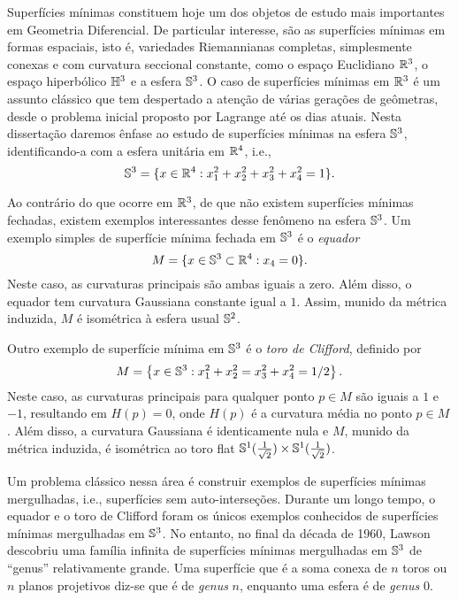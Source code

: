 Superf\'icies m\'inimas constituem hoje um dos objetos de estudo
mais importantes em Geometria Diferencial. De particular interesse, 
s\~ao as superf\'icies m\'inimas em formas espaciais, isto é, variedades Riemannianas completas, simplesmente conexas e com curvatura seccional constante, 
como o espa\c co Euclidiano $\mathbb{R}^3$, o espa\c co hiperb\'olico $\mathbb{H}^3$
e a esfera $\mathbb{S}^3$. O caso de superf\'icies m\'inimas em $\mathbb{R}^3$ \'e um
assunto cl\'assico que tem despertado a aten\c c\~ao de v\'arias 
gera\c c\~oes de ge\^ometras, desde o problema inicial proposto por 
Lagrange at\'e os dias atuais. Nesta disserta\c c\~ao daremos
\^enfase ao estudo de superf\'icies m\'inimas na esfera $\mathbb{S}^3$, 
identificando-a com a esfera unit\'aria em $\mathbb{R}^4$, i.e.,
\[
\mathbb{S}^3=\{x\in\mathbb{R}^4:x_1^2+x_2^2+x_3^2+x_4^2=1\}.
\]



Ao contr\'ario do que ocorre em $\mathbb{R}^3$, de que n\~ao existem 
superf\'icies m\'inimas fechadas, existem exemplos interessantes
desse fen\^omeno na esfera $\mathbb{S}^3$. Um exemplo simples de 
superf\'icie m\'inima fechada em $\mathbb{S}^3$ \'e o {\em equador}
\[
M=\{x\in\mathbb{S}^3\subset\mathbb{R}^4:x_4=0\}.
\]
Neste caso, as curvaturas principais s\~ao ambas iguais a zero. 
Al\'em disso, o equador tem curvatura Gaussiana
constante igual a $1$. Assim, munido da m\'etrica induzida, $M$ \'e
isom\'etrica \`a esfera usual $\mathbb{S}^2$.

Outro exemplo de superf\'icie m\'inima em $\mathbb{S}^3$ \'e o {\em toro de
	Clifford}, definido por
\[
M=\left\{x\in\mathbb{S}^3:x_1^2+x_2^2=x_3^2+x_4^2=1/2\right\}.
\]
Neste caso, as curvaturas principais para qualquer ponto $p \in M$ s\~ao iguais a $1$ e $-1$, 
resultando em $H(p)=0$, onde $H(p)$ é a curvatura média no ponto $p \in M$. Al\'em disso, a curvatura Gaussiana \'e 
identicamente nula e $M$, munido da m\'etrica induzida, \'e 
isom\'etrica ao toro flat 
$\mathbb{S}^1(\frac{1}{\sqrt2})\times\mathbb{S}^1(\frac{1}{\sqrt2})$.

Um problema cl\'assico nessa \'area \'e construir exemplos
de superf\'icies m\'inimas mergulhadas, i.e., superf\'icies sem 
auto-interse\c c\~oes. Durante um longo tempo, o equador e 
o toro de Clifford foram os \'unicos exemplos conhecidos de 
superf\'icies m\'inimas mergulhadas em $\mathbb{S}^3$. No entanto, 
no final da d\'ecada de 1960, Lawson \cite{Lawson1970} 
descobriu uma fam\'ilia infinita de superf\'icies m\'inimas 
mergulhadas em $\mathbb{S}^3$ de ``genus'' relativamente grande.
Uma superfície que é a soma conexa de $n$ toros ou $n$ planos projetivos diz-se que é de \emph{genus} $n$, enquanto uma esfera é de \emph{genus} $0$.

